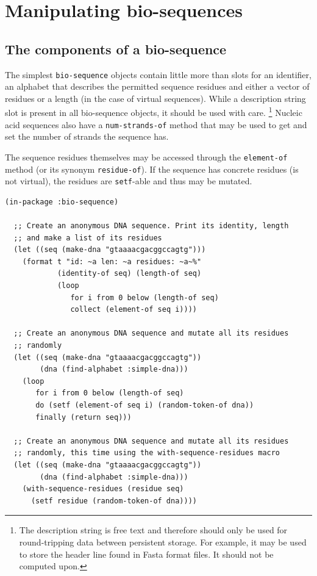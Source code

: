 \documentclass[a4paper, 12pt]{article}
\begin{document}
\section{Manipulating bio-sequences}
\label{sec:manipulating-bioseq}

\subsection{The components of a bio-sequence}
\label{sec:components-of-bioseq}

The simplest \lstinline!bio-sequence! objects contain little more than
slots for an identifier, an alphabet that describes the permitted
sequence residues and either a vector of residues or a length (in the
case of virtual sequences). While a description string slot is present
in all bio-sequence objects, it should be used with
care. \footnote{The description string is free text and therefore
  should only be used for round-tripping data between persistent
  storage. For example, it may be used to store the header line found
  in Fasta format files. It should not be computed upon.}  Nucleic
acid sequences also have a \lstinline!num-strands-of! method that may
be used to get and set the number of strands the sequence has.

The sequence residues themselves may be accessed through the
\lstinline!element-of! method (or its synonym
\lstinline!residue-of!). If the sequence has concrete residues (is not
virtual), the residues are \lstinline!setf!-able and thus may be
mutated. 

\begin{lstlisting}[caption={The components of a bio-sequence},
  label=lst:components-of-bioseq]
  (in-package :bio-sequence)

  ;; Create an anonymous DNA sequence. Print its identity, length
  ;; and make a list of its residues
  (let ((seq (make-dna "gtaaaacgacggccagtg")))
    (format t "id: ~a len: ~a residues: ~a~%"
            (identity-of seq) (length-of seq)
            (loop
               for i from 0 below (length-of seq)
               collect (element-of seq i))))

  ;; Create an anonymous DNA sequence and mutate all its residues
  ;; randomly
  (let ((seq (make-dna "gtaaaacgacggccagtg"))
        (dna (find-alphabet :simple-dna)))
    (loop
       for i from 0 below (length-of seq)
       do (setf (element-of seq i) (random-token-of dna))
       finally (return seq)))
  
  ;; Create an anonymous DNA sequence and mutate all its residues
  ;; randomly, this time using the with-sequence-residues macro
  (let ((seq (make-dna "gtaaaacgacggccagtg"))
        (dna (find-alphabet :simple-dna)))
    (with-sequence-residues (residue seq)
      (setf residue (random-token-of dna))))
\end{lstlisting}
\end{document}
